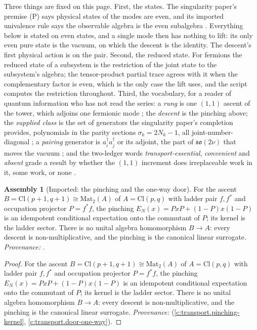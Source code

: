 \documentclass[11pt]{article}
\theoremstyle{definition}
\newtheorem{assembled}[theorem]{Assembly}
\theoremstyle{plain}
\providecommand{\Cl}{}\renewcommand{\Cl}{\mathrm{Cl}}
\providecommand{\EN}{}\renewcommand{\EN}{E_{N}}
\begin{document}
Three things are fixed on this page. First, the states. The singularity paper's premise (P) says physical states of the modes are even, and its imported univalence rule says the observable algebra is the even subalgebra \cite[Prem.~7.8, Fact~7.9]{ButlerT5}. Everything below is stated on even states, and a single mode then has nothing to lift: its only even pure state is the vacuum, on which the descent is the identity. The descent's first physical action is on the pair. Second, the reduced state. For fermions the reduced state of a subsystem is the restriction of the joint state to the subsystem's algebra; the tensor-product partial trace agrees with it when the complementary factor is even, which is the only case the lift uses, and the script computes the restriction throughout. Third, the vocabulary, for a reader of quantum information who has not read the series: a \emph{rung} is one $(1,1)$ ascent of the tower, which adjoins one fermionic mode \cite[Thm.~4.2]{ButlerT3}; the \emph{descent} is the pinching above; the \emph{supplied class} is the set of generators the singularity paper's completion provides, polynomials in the parity sections $\sigma_{k} = 2N_{k} - 1$, all joint-number-diagonal \cite[Prem.~7.30, Thm.~C.8]{ButlerT5}; a \emph{pairing} generator is $a^{\dagger}_{i}a^{\dagger}_{j}$ or its adjoint, the part of $\mathfrak{so}(2\nu)$ that moves the vacuum \cite[Prop.~13.4]{ButlerT5}; and the two-ledger words \emph{transport-essential}, \emph{convenient} and \emph{absent} grade a result by whether the $(1,1)$ increment does irreplaceable work in it, some work, or none \cite{ButlerT17}.

\begin{assembled}[Imported: the pinching and the one-way door]\label{c:descent-lift.imported-pinching-one-way-door}
For the ascent $B = \Cl(p+1, q+1) \cong \mathrm{Mat}_{2}(A)$ of $A = \Cl(p,q)$ with ladder pair $f, f^{*}$ and occupation projector $P = f^{*}f$, the pinching $\EN(x) = PxP + (1-P)x(1-P)$ is an idempotent conditional expectation onto the commutant of $P$; its kernel is the ladder sector. There is no unital algebra homomorphism $B \to A$: every descent is non-multiplicative, and the pinching is the canonical linear surrogate. \emph{Provenance:} \cite[Prop.~7.5, Thm.~7.6]{ButlerT1}.
\end{assembled}
\begin{proof}
For the ascent $B = \Cl(p+1, q+1) \cong \mathrm{Mat}_{2}(A)$ of $A = \Cl(p,q)$ with ladder pair $f, f^{*}$ and occupation projector $P = f^{*}f$, the pinching $\EN(x) = PxP + (1-P)x(1-P)$ is an idempotent conditional expectation onto the commutant of $P$; its kernel is the ladder sector. There is no unital algebra homomorphism $B \to A$: every descent is non-multiplicative, and the pinching is the canonical linear surrogate. \emph{Provenance:} \cite[Prop.~7.5, Thm.~7.6]{ButlerT1} (\ref{c:transport.pinching-kernel}, \ref{c:transport.door-one-way}).

\end{proof}
\end{document}
